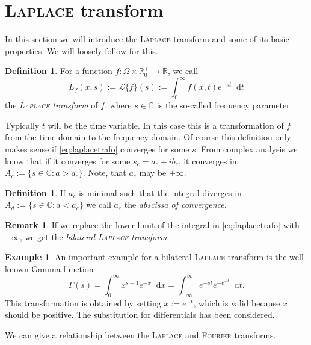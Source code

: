 \documentclass[12pt,a4paper,twoside, open=right]{scrreprt}
\theoremstyle{definition}
\newtheorem{rem}[auf]{Remark}
\newtheorem{defn}[auf]{Definition}
\newtheorem{bsp}[auf]{Example}
\theoremstyle{plain}
\newcommand{\rr}{\mathbb{R}}
\newcommand{\cc}{\mathbb{C}}
\newcommand{\D}{\mathop{}\!\mathrm{d}}
\begin{document}
\section{\textsc{Laplace} transform}
\label{sec:laplacetransform}
In this section we will introduce the \textsc{Laplace} transform and some of its basic properties. We will loosely follow \cite{Widder1945} for this.
\begin{defn}
    For a function $f\colon\Omega\times\rr^+_0\to\rr$, we call
    \begin{equation}
        L_f(x,s):=\mathcal{L}\{f\}(s):=\int_0^\infty f(x,t)e^{-st}\D t\label{eq:laplacetrafo}
    \end{equation}
    the \emph{\textsc{Laplace} transform} of $f$, where $s\in\cc$ is the so-called frequency parameter. 
\end{defn}
Typically $t$ will be the time variable. In this case this is a transformation of $f$ from the time domain to the frequency domain. Of course this definition only makes sense if \eqref{eq:laplacetrafo} converges for some $s$. From complex analysis we know that if it converges for some $s_c=a_c+ib_c$, it converges in $A_c:=\{s\in\cc\colon a>a_c\}$. Note, that $a_c$ may be $\pm\infty$.
\begin{defn}
    If $a_c$ is minimal such that the integral diverges in $A_d:=\{s\in\cc\colon a<a_c\}$ we call $a_c$ the \emph{abscissa of convergence}. 
\end{defn}
\begin{rem}
    If we replace the lower limit of the integral in \eqref{eq:laplacetrafo} with $-\infty$, we get the \emph{bilateral \textsc{Laplace} transform}.
\end{rem}
\begin{bsp}
    An important example for a bilateral \textsc{Laplace} transform is the well-known Gamma function
    \begin{equation}
        \Gamma(s)=\int_0^\infty x^{s-1}e^{-x}\D x=\int_{-\infty}^\infty e^{-st}e^{-e^{-t}}\D t.
    \end{equation}
    This transformation is obtained by setting $x:=e^{-t}$, which is valid because $x$ should be positive. The substitution for differentials has been considered. 
\end{bsp}
We can give a relationship between the \textsc{Laplace} and \textsc{Fourier} transforms.
\end{document}
